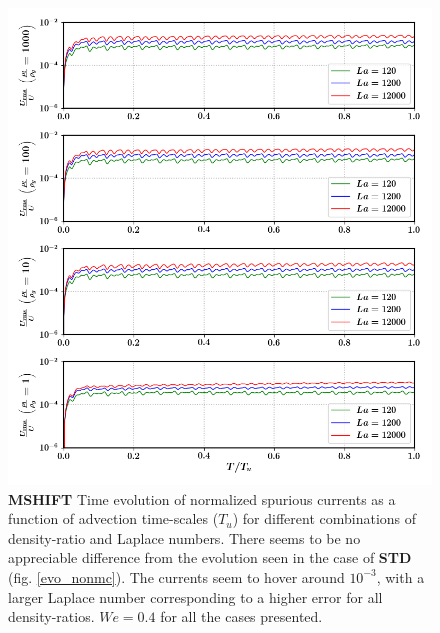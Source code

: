 \begin{figure}[h!]
    \centering
    \includegraphics[]{plots/droplet_advect/evo_daniel.png}
	\caption{\textbf{MSHIFT} Time evolution of normalized spurious currents as a function of advection time-scales ($T_u$) for different combinations of density-ratio and Laplace numbers. There seems to be no appreciable difference from the evolution seen in the case of \textbf{STD} (fig. \ref{evo_nonmc}). The currents seem to hover around $10^{-3}$, with a larger Laplace number corresponding to a higher error for all density-ratios. $We = 0.4$ for all the cases presented.}   
    \label{evo_daniel}
\end{figure}

